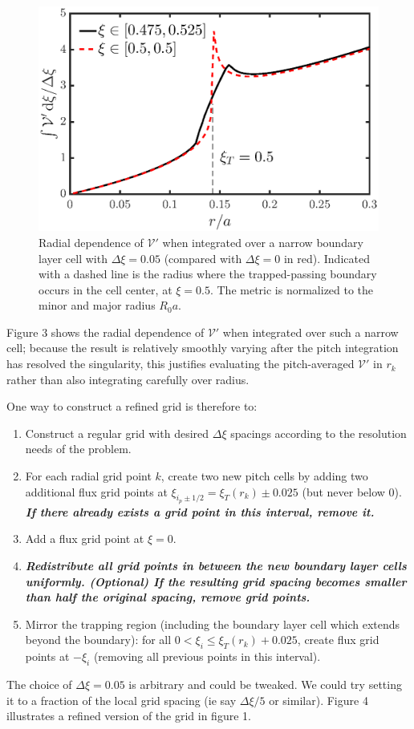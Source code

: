 \documentclass[11pt,a4paper]{article}
\begin{document}
\begin{figure}[H]
\begin{center}
\includegraphics[width=1.02\textwidth,trim=0 0mm 0 10mm]{trappedbc_IntegratedVpPlot}
\caption{Radial dependence of $\mathcal{V}'$ when integrated over a narrow boundary layer cell with $\Delta \xi=0.05$ (compared with $\Delta\xi=0$ in red). Indicated with a dashed line is the radius where the trapped-passing boundary occurs in the cell center, at $\xi=0.5$. The metric is normalized to the minor and major radius $R_0a$.}
\end{center}
\end{figure}


Figure 3 shows the radial dependence of $\mathcal{V}'$ when integrated over such a narrow cell; because the result is relatively smoothly varying after the pitch integration has resolved the singularity, this justifies evaluating the pitch-averaged $\mathcal{V}'$ in $r_k$ rather than also integrating carefully over radius.

One way to construct a refined grid is therefore to:
\begin{enumerate}
\item Construct a regular grid with desired $\Delta \xi$ spacings according to the resolution needs of the problem.
\item For each radial grid point $k$, create two new pitch cells by adding two additional flux grid points at $\xi_{i_p\pm1/2} = \xi_T(r_k) \pm 0.025$ (but never below 0). {\bf \emph{If there already exists a grid point in this interval, remove it.}}
\item Add a flux grid point at $\xi=0$.
\item {\bf \emph{Redistribute all grid points in between the new boundary layer cells uniformly. (Optional) If the resulting grid spacing becomes smaller than half the original spacing, remove grid points.}}
\item Mirror the trapping region (including the boundary layer cell which extends beyond the boundary): for all $0 < \xi_i \leq \xi_T(r_k)+0.025$, create flux grid points at $-\xi_i$ (removing all previous points in this interval).
\end{enumerate}
The choice of $\Delta \xi = 0.05$ is arbitrary and could be tweaked. We could try setting it to a fraction of the local grid spacing (ie say $\Delta \xi/5$ or similar).
Figure 4 illustrates a refined version of the grid in figure 1.
\end{document}

